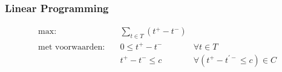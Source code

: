 \begin{frame}\frametitle{Linear Programming}
    \begin{definition}
        \begin{align}
            \text{max:}& \quad \sum_{t \in T} (t^+ - t^-) & \nonumber \\
            \text{met voorwaarden:} & \quad 0 \leq t^+ - t^- & \forall t \in T \nonumber \\
                                    & \quad t^+ - t^- \leq c & \forall (t^+ - t^{'-} \leq c) \in C \nonumber
        \end{align}
    \end{definition}
\end{frame}
